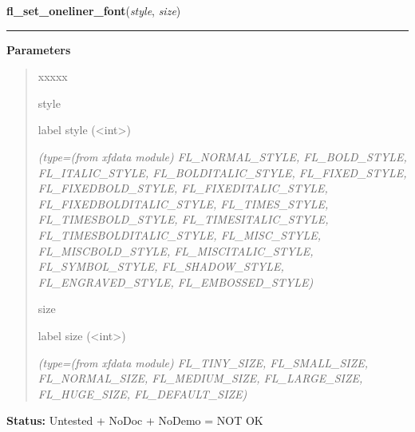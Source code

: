 \hspace{.8\funcindent}\begin{boxedminipage}{\funcwidth}

    \raggedright \textbf{fl\_set\_oneliner\_font}(\textit{style}, \textit{size})

    \vspace{-1.5ex}

    \rule{\textwidth}{0.5\fboxrule}
\setlength{\parskip}{2ex}
\setlength{\parskip}{1ex}
      \textbf{Parameters}
      \vspace{-1ex}

      \begin{quote}
        \begin{Ventry}{xxxxx}

          \item[style]

          label style ({\textless}int{\textgreater})

            {\it (type=(from xfdata module) FL\_NORMAL\_STYLE, FL\_BOLD\_STYLE, FL\_ITALIC\_STYLE,
FL\_BOLDITALIC\_STYLE, FL\_FIXED\_STYLE, FL\_FIXEDBOLD\_STYLE, 
FL\_FIXEDITALIC\_STYLE, FL\_FIXEDBOLDITALIC\_STYLE, FL\_TIMES\_STYLE, 
FL\_TIMESBOLD\_STYLE, FL\_TIMESITALIC\_STYLE, FL\_TIMESBOLDITALIC\_STYLE, 
FL\_MISC\_STYLE, FL\_MISCBOLD\_STYLE, FL\_MISCITALIC\_STYLE, 
FL\_SYMBOL\_STYLE, FL\_SHADOW\_STYLE, FL\_ENGRAVED\_STYLE, 
FL\_EMBOSSED\_STYLE)}

          \item[size]

          label size ({\textless}int{\textgreater})

            {\it (type=(from xfdata module) FL\_TINY\_SIZE, FL\_SMALL\_SIZE, FL\_NORMAL\_SIZE, 
FL\_MEDIUM\_SIZE, FL\_LARGE\_SIZE, FL\_HUGE\_SIZE, FL\_DEFAULT\_SIZE)}

        \end{Ventry}

      \end{quote}

\textbf{Status:} Untested + NoDoc + NoDemo = NOT OK



    \end{boxedminipage}

    \label{xformslib:library:fl_set_oneliner_color}

    \vspace{0.5ex}

